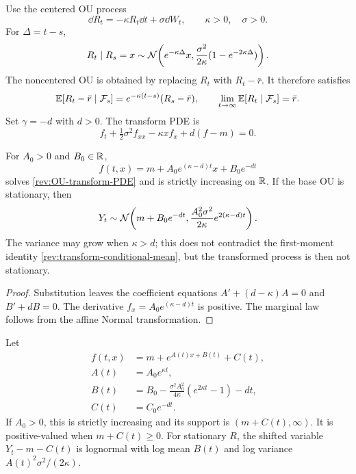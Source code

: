 Use the centered OU process
\begin{equation}
\dd R_t=-\kappa R_t\dd t+\sigma\dd W_t,
\qquad \kappa>0,\quad\sigma>0.
\label{rev:OU}
\end{equation}
For $\Delta=t-s$,
\begin{equation}
R_t\mid R_s=x\sim
\mathcal N\!\left(e^{-\kappa\Delta}x,
\frac{\sigma^2}{2\kappa}(1-e^{-2\kappa\Delta})\right).
\label{rev:OU-transition}
\end{equation}
The noncentered OU is obtained by replacing $R_t$ with $R_t-\bar r$.
It therefore satisfies
\begin{equation}
\mathbb E[R_t-\bar r\mid\mathcal F_s]
=e^{-\kappa(t-s)}(R_s-\bar r),
\qquad
\lim_{t\to\infty}\mathbb E[R_t\mid\mathcal F_s]=\bar r.
\label{rev:OU-conditional-mean}
\end{equation}
Set $\gamma=-d$ with $d>0$.  The transform PDE is
\begin{equation}
f_t+\tfrac12\sigma^2f_{xx}-\kappa xf_x+d(f-m)=0.
\label{rev:OU-transform-PDE}
\end{equation}

\begin{example}
\label{rev:ex-affine-OU}
For $A_0>0$ and $B_0\in\mathbb R$,
\begin{equation}
f(t,x)=m+A_0e^{(\kappa-d)t}x+B_0e^{-dt}
\label{rev:affine-OU-transform}
\end{equation}
solves \eqref{rev:OU-transform-PDE} and is strictly increasing on $\mathbb R$.
If the base OU is stationary, then
\begin{equation}
Y_t\sim\mathcal N\!\left(m+B_0e^{-dt},
\frac{A_0^2\sigma^2}{2\kappa}e^{2(\kappa-d)t}\right).
\label{rev:affine-OU-margin}
\end{equation}
The variance may grow when $\kappa>d$; this does not contradict the first-moment
identity \eqref{rev:transform-conditional-mean}, but the transformed process is
then not stationary.
\end{example}

\begin{proof}
Substitution leaves the coefficient equations
$A'+(d-\kappa)A=0$ and $B'+dB=0$.  The derivative
$f_x=A_0e^{(\kappa-d)t}$ is positive.  The marginal law follows from the affine
Normal transformation.
\end{proof}

\begin{example}
\label{rev:ex-exponential-OU}
Let
\begin{align}
f(t,x)&=m+e^{A(t)x+B(t)}+C(t),\label{rev:exp-OU-transform}\\
A(t)&=A_0e^{\kappa t},\label{rev:exp-OU-A}\\
B(t)&=B_0-\frac{\sigma^2A_0^2}{4\kappa}
             (e^{2\kappa t}-1)-dt,\label{rev:exp-OU-B}\\
C(t)&=C_0e^{-dt}.\label{rev:exp-OU-C}
\end{align}
If $A_0>0$, this is strictly increasing and its support is
$(m+C(t),\infty)$.  It is positive-valued when $m+C(t)\ge0$.  For stationary
$R$, the shifted variable $Y_t-m-C(t)$ is lognormal with log mean $B(t)$ and
log variance $A(t)^2\sigma^2/(2\kappa)$.
\end{example}

